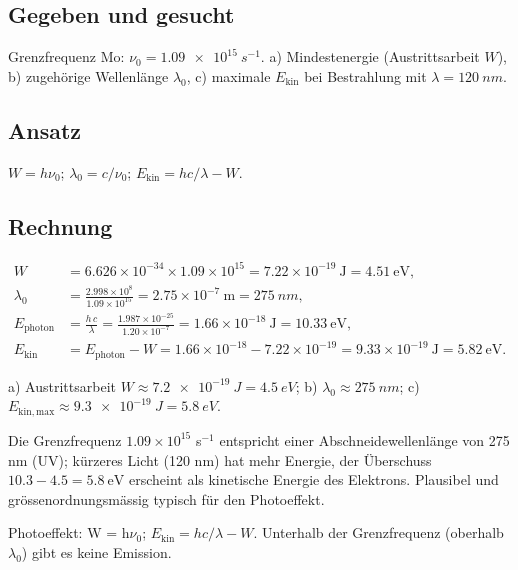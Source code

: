 
\subsection*{Gegeben und gesucht}
Grenzfrequenz Mo: $\nu_0 = \qty{1.09e15}{s^{-1}}$.
a) Mindestenergie (Austrittsarbeit $W$),
b) zugehörige Wellenlänge $\lambda_0$,
c) maximale $E_{\text{kin}}$ bei Bestrahlung mit $\lambda = \qty{120}{nm}$.

\subsection*{Ansatz}
$W = h\nu_0$; $\lambda_0 = c/\nu_0$; $E_{\text{kin}} = hc/\lambda - W$.

\subsection*{Rechnung}
\begin{align*}
  W &= 6.626\times10^{-34}\times 1.09\times10^{15}
  = 7.22\times10^{-19}\ \mathrm{J}
  = 4.51\ \mathrm{eV}, \\[2pt]
  \lambda_0 &= \frac{2.998\times10^{8}}{1.09\times10^{15}}
  = 2.75\times10^{-7}\ \mathrm{m}
  = \qty{275}{nm}, \\[2pt]
  E_{\text{photon}} &= \frac{h\,c}{\lambda}
  = \frac{1.987\times10^{-25}}{1.20\times10^{-7}}
  = 1.66\times10^{-18}\ \mathrm{J}
  = 10.33\ \mathrm{eV}, \\[2pt]
  E_{\text{kin}} &= E_{\text{photon}} - W
  = 1.66\times10^{-18} - 7.22\times10^{-19}
  = 9.33\times10^{-19}\ \mathrm{J}
  = 5.82\ \mathrm{eV}.
\end{align*}

\begin{ergebnis}
a) Austrittsarbeit $W \approx \qty{7.2e-19}{J} = \qty{4.5}{eV}$;
b) $\lambda_0 \approx \qty{275}{nm}$;
c) $E_{\mathrm{kin,max}} \approx \qty{9.3e-19}{J} = \qty{5.8}{eV}$.
\end{ergebnis}

\begin{kontrolle}
Die Grenzfrequenz $1.09\times10^{15}$ s$^{-1}$ entspricht einer
Abschneidewellenlänge von 275 nm (UV); kürzeres Licht (120 nm) hat mehr
Energie, der Überschuss $10.3 - 4.5 = 5.8\ \mathrm{eV}$ erscheint als
kinetische Energie des Elektrons. Plausibel und grössenordnungsmässig typisch
für den Photoeffekt.
\end{kontrolle}

\begin{merksatz}
Photoeffekt: W = h$\nu_0$; $E_{\text{kin}} = hc/\lambda - W$. Unterhalb der
Grenzfrequenz (oberhalb $\lambda_0$) gibt es keine Emission.
\end{merksatz}
